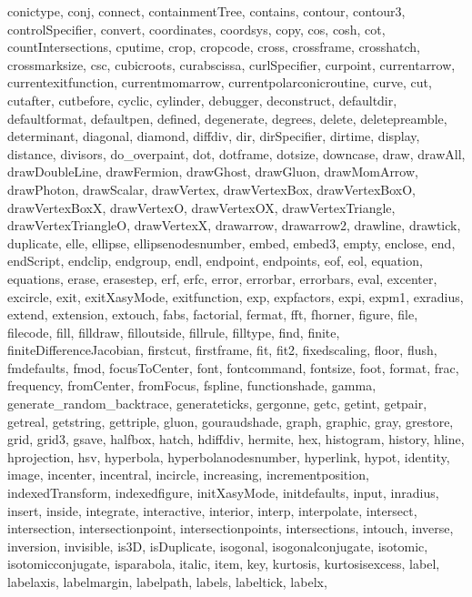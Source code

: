 {{  conictype, conj, connect, containmentTree, contains, contour, contour3,
  controlSpecifier, convert, coordinates, coordsys, copy, cos, cosh, cot,
  countIntersections, cputime, crop, cropcode, cross, crossframe, crosshatch,
  crossmarksize, csc, cubicroots, curabscissa, curlSpecifier, curpoint,
  currentarrow, currentexitfunction, currentmomarrow,
  currentpolarconicroutine, curve, cut, cutafter, cutbefore, cyclic,
  cylinder, debugger, deconstruct, defaultdir, defaultformat, defaultpen,
  defined, degenerate, degrees, delete, deletepreamble, determinant,
  diagonal, diamond, diffdiv, dir, dirSpecifier, dirtime, display, distance,
  divisors, do_overpaint, dot, dotframe, dotsize, downcase, draw, drawAll,
  drawDoubleLine, drawFermion, drawGhost, drawGluon, drawMomArrow,
  drawPhoton, drawScalar, drawVertex, drawVertexBox, drawVertexBoxO,
  drawVertexBoxX, drawVertexO, drawVertexOX, drawVertexTriangle,
  drawVertexTriangleO, drawVertexX, drawarrow, drawarrow2, drawline,
  drawtick, duplicate, elle, ellipse, ellipsenodesnumber, embed, embed3,
  empty, enclose, end, endScript, endclip, endgroup, endl, endpoint,
  endpoints, eof, eol, equation, equations, erase, erasestep, erf, erfc,
  error, errorbar, errorbars, eval, excenter, excircle, exit, exitXasyMode,
  exitfunction, exp, expfactors, expi, expm1, exradius, extend, extension,
  extouch, fabs, factorial, fermat, fft, fhorner, figure, file, filecode,
  fill, filldraw, filloutside, fillrule, filltype, find, finite,
  finiteDifferenceJacobian, firstcut, firstframe, fit, fit2, fixedscaling,
  floor, flush, fmdefaults, fmod, focusToCenter, font, fontcommand, fontsize,
  foot, format, frac, frequency, fromCenter, fromFocus, fspline,
  functionshade, gamma, generate_random_backtrace, generateticks, gergonne,
  getc, getint, getpair, getreal, getstring, gettriple, gluon, gouraudshade,
  graph, graphic, gray, grestore, grid, grid3, gsave, halfbox, hatch,
  hdiffdiv, hermite, hex, histogram, history, hline, hprojection, hsv,
  hyperbola, hyperbolanodesnumber, hyperlink, hypot, identity, image,
  incenter, incentral, incircle, increasing, incrementposition,
  indexedTransform, indexedfigure, initXasyMode, initdefaults, input,
  inradius, insert, inside, integrate, interactive, interior, interp,
  interpolate, intersect, intersection, intersectionpoint,
  intersectionpoints, intersections, intouch, inverse, inversion, invisible,
  is3D, isDuplicate, isogonal, isogonalconjugate, isotomic,
  isotomicconjugate, isparabola, italic, item, key, kurtosis, kurtosisexcess,
  label, labelaxis, labelmargin, labelpath, labels, labeltick, labelx,
}}
